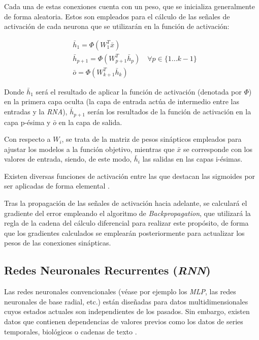 Cada una de estas conexiones cuenta con un peso, que se inicializa generalmente de forma aleatoria. Estos son
empleados para el cálculo de las señales de activación de cada neurona que se utilizarán en la función de activación:

\begin{equation}
    \begin{aligned}
    & \bar{h}_1=\Phi\left(W_1^T \bar{x}\right) \\
    & \bar{h}_{p+1}=\Phi\left(W_{p+1}^T \bar{h}_p\right) \quad \forall p \in\{1 \ldots k-1\}\\
    & \bar{o}=\Phi\left(W_{k+1}^T \bar{h}_k\right)
    \end{aligned}
\end{equation}

Donde \begin{math}\bar{h}_1\end{math} será el resultado de aplicar la función de activación (denotada por \(\Phi\)) en la primera capa oculta (la capa de entrada
actúa de intermedio entre las entradas y la \textit{RNA}), \begin{math}\bar{h}_{p+1}\end{math} serán los resultados de la función de activación
en la capa p-ésima y \begin{math}\bar{o}\end{math} en la capa de salida.

Con respecto a \(W_i\), se trata de la matriz de pesos sinápticos empleados para ajustar los modelos a la función
objetivo, mientras que \(\bar{x}\) se corresponde con los valores de entrada, siendo, de este modo, 
\(\bar{h}_i\) las salidas en las capas i-ésimas.


Existen diversas funciones de activación entre las que destacan las sigmoides por ser aplicadas de forma 
elemental \cite{book:aggarwal2018}.

Tras la propagación de las señales de activación hacia adelante, se calculará el gradiente del error empleando el algoritmo
de \textit{Backpropagation}, que utilizará la regla de la cadena del cálculo diferencial para realizar este propósito, de forma 
que los gradientes calculados se emplearán posteriormente para actualizar los pesos de las conexiones sinápticas.

\subsection{Redes Neuronales Recurrentes (\textit{RNN})}
Las redes neuronales convencionales (véase por ejemplo los \textit{MLP}, las redes neuronales de base radial, etc.) están diseñadas para
datos multidimensionales cuyos estados actuales son independientes de los pasados.
Sin embargo, existen datos que contienen dependencias de valores previos como los datos de series temporales, 
biológicos o cadenas de texto \cite{book:aggarwal2018}.

